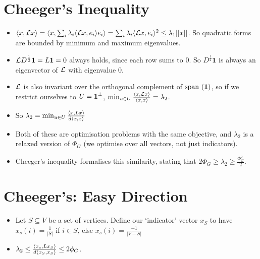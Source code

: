 \documentclass[11pt]{article}
\begin{document}
\section{Cheeger's Inequality}
\label{sec:orgef92cb2}
\begin{itemize}
\item \(\langle x , \mathcal{L} x \rangle=\langle x , \sum_i \lambda_i\langle \mathcal{L} x , e_i \rangle e_i \rangle=\sum_i \lambda_i\langle \mathcal{L} x , e_i \rangle^2 \le \lambda_1 ||x||\). So quadratic forms are bounded by minimum and maximum eigenvalues.
\item \(\mathcal{L} D^{\frac12}\textbf{1}=L \textbf{1}=0\) always holds, since each row sums to \(0\). So \(D^{\frac12}\textbf{1}\) is always an eigenvector of \(\mathcal{L}\) with eigenvalue \(0\).
\item \(\mathcal{L}\) is also invariant over the orthogonal complement of \(\text{span }(\textbf{1})\), so if we restrict ourselves to \(U=\textbf{1}^{\perp}\), \(\min_{u \in U}\frac{\langle x , \mathcal{L} x \rangle}{\langle x , x \rangle}=\lambda_2\).
\item So \(\lambda_2=\min_{u \in U}\frac{\langle x , Lx \rangle}{d\langle x , x \rangle}\)
\item Both of these are optimisation problems with the same objective, and \(\lambda_2\) is a relaxed version of \(\Phi_G\) (we optimise over all vectors, not just indicators).
\item Cheeger's inequality formalises this similarity, stating that \(2 \Phi_G \ge \lambda_2 \ge \frac{\Phi_{G}^{2}}{2}\).
\end{itemize}
\section{Cheeger's: Easy Direction}
\label{sec:orgf0982a0}
\begin{itemize}
\item Let \(S \subseteq V\) be a set of vertices. Define our `indicator' vector \(x_S\) to have \(x_s(i)=\frac{1}{|S|}\) if \(i \in S\), else \(x_s(i)=\frac{-1}{|V-S|}\)
\item \(\lambda_2 \le \frac{\langle x_s , Lx_S \rangle}{d\langle x_S , x_S \rangle} \le 2\phi_G\).
\end{itemize}
\end{document}
